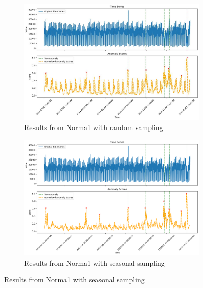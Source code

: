 \documentclass[11pt]{article}
\begin{document}
\begin{figure}[h]
    \centering
    \begin{subfigure}[b]{0.4\textwidth}
        \includegraphics[width=\textwidth]{algo0.jpg}
        \caption{Results from Norma1 with random sampling}
        \label{fig:algo0}
    \end{subfigure}

    \begin{subfigure}[b]{0.4\textwidth}
        \includegraphics[width=\textwidth]{algo1.png}
        \caption{Results from Norma1 with seasonal sampling}
        \label{fig:algo1}
    \end{subfigure}


\end{figure}
\end{document}
